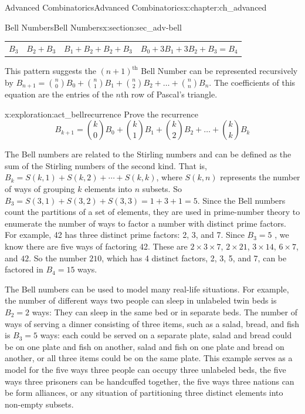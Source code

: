 \documentclass[oneside,10pt,]{book}
\numberwithin{equation}{chapter}
\begin{document}
\begin{chapterptx}{Advanced Combinatorics}{}{Advanced Combinatorics}{}{}{x:chapter:ch_advanced}
\begin{sectionptx}{Bell Numbers}{}{Bell Numbers}{}{}{x:section:sec_adv-bell}
\begin{sidebyside}{1}{0}{0}{0}
\begin{sbspanel}{1}
{\begin{tabular}{llll}
\(B_{3}\)&\(B_{2} + B_{3}\)&\(B_{1} + B_{2} + B_{2} + B_{3}\)&\(B_{0} + 3B_{1} + 3B_{2} + B_{3} = B_{4}\)
\end{tabular}
\par}
\end{sbspanel}%
\end{sidebyside}%
\par
This pattern suggests the \({(n + 1)}^{\text{th}}\) Bell Number can be represented recursively by \(B_{n + 1} = \binom{n}{0} B_{0} + \binom{n}{1} B_{1} + \binom{n}{2}B_{2} + \ldots + \binom{n}{n} B_{n}\). The coefficients of this equation are the entries of the \(n\)th row of Pascal's triangle.%
\begin{exploration}{}{x:exploration:act_bellrecurrence}%
Prove the recurrence%
\begin{equation*}
B_{k + 1} = \binom{k}{0} B_{0} + \binom{k}{1} B_{1} + \binom{k}{2}B_{2} + \ldots + \binom{k}{k} B_{k}
\end{equation*}
%
\end{exploration}
The Bell numbers are related to the Stirling numbers and can be defined as the sum of the Stirling numbers of the second kind. That is, \(B_{k} = S(k,1) + S(k,2) + \cdots + S(k,k)\), where \(S(k,n)\) represents the number of ways of grouping \(k\) elements into \(n\) subsets. So \(B_{3} = S(3,1) + S(3,2) + S(3,3) = 1 + 3 + 1 = 5\). Since the Bell numbers count the partitions of a set of elements, they are used in prime-number theory to enumerate the number of ways to factor a number with distinct prime factors. For example, 42 has three distinct prime factors: 2, 3, and 7. Since \(B_{3} = 5\) , we know there are five ways of factoring 42. These are \(2 \times 3 \times 7\), \(2 \times 21\), \(3 \times 14\), \(6 \times 7\), and \(42\). So the number \(210\), which has 4 distinct factors, 2, 3, 5, and 7, can be factored in \(B_{4} = 15\) ways.%
\par
The Bell numbers can be used to model many real-life situations. For example, the number of different ways two people can sleep in unlabeled twin beds is \(B_{2} = 2\) ways: They can sleep in the same bed or in separate beds. The number of ways of serving a dinner consisting of three items, such as a salad, bread, and fish is \(B_{3} = 5\) ways: each could be served on a separate plate, salad and bread could be on one plate and fish on another, salad and fish on one plate and bread on another, or all three items could be on the same plate. This example serves as a model for the five ways three people can occupy three unlabeled beds, the five ways three prisoners can be handcuffed together, the five ways three nations can be form alliances, or any situation of partitioning three distinct elements into non-empty subsets.%

\end{sectionptx}
\end{chapterptx}
\end{document}
